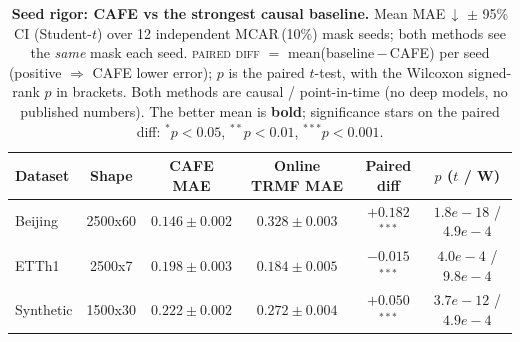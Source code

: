 \begin{table}[tbp]\centering\small
\setlength{\tabcolsep}{4pt}
\caption{\textbf{Seed rigor: CAFE vs the strongest causal baseline.} Mean MAE\,$\downarrow$ $\pm$ 95\% CI (Student-$t$) over 12 independent MCAR\,(10\%) mask seeds; both methods see the \emph{same} mask each seed. \textsc{paired diff} $=$ mean(baseline\,$-$\,CAFE) per seed (positive $\Rightarrow$ CAFE lower error); $p$ is the paired $t$-test, with the Wilcoxon signed-rank $p$ in brackets. Both methods are causal / point-in-time (no deep models, no published numbers). The better mean is \textbf{bold}; significance stars on the paired diff: $^{*}p{<}0.05$, $^{**}p{<}0.01$, $^{***}p{<}0.001$.}
\label{tab:seeds}
\begin{tabular}{@{}lccccc@{}}
\toprule
Dataset & Shape & CAFE MAE & Online TRMF MAE & Paired diff & $p$ ($t$ / W) \\
\midrule
Beijing & 2500x60 & $\mathbf{0.146}\pm0.002$ & $0.328\pm0.003$ & $+0.182$$^{***}$ & $1.8e-18$ / $4.9e-4$ \\
ETTh1 & 2500x7 & $0.198\pm0.003$ & $\mathbf{0.184}\pm0.005$ & $-0.015$$^{***}$ & $4.0e-4$ / $9.8e-4$ \\
Synthetic & 1500x30 & $\mathbf{0.222}\pm0.002$ & $0.272\pm0.004$ & $+0.050$$^{***}$ & $3.7e-12$ / $4.9e-4$ \\
\bottomrule
\end{tabular}
\end{table}
